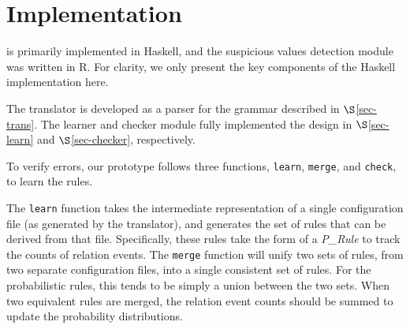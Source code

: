 \section{Implementation}

\app is primarily implemented in Haskell, and the suspicious values
detection module was written in R. 
For clarity,
we only present the key components of the Haskell implementation here.

The translator is developed as a parser for the grammar
described in $\S$\ref{sec-trans}. 
The learner and checker module fully implemented 
the design in $\S$\ref{sec-learn} and $\S$\ref{sec-checker},
respectively. 
 




To verify errors,
our prototype follows three functions, 
\lstinline{learn}, \lstinline{merge}, and \lstinline{check},
to learn the rules.

The \lstinline{learn} function takes the intermediate representation of 
a single configuration file (as generated by the translator), 
and generates the set of rules that can be derived from that file.
Specifically, these rules take the form of 
a \textit{P\_Rule} to track the counts of relation events.
The \lstinline{merge} function will unify two sets of rules, from two separate configuration files, into a single consistent set of rules. 
For the probabilistic rules, this tends to be simply a union between the two sets. 
When two equivalent rules are merged, the relation event counts should be summed to update the probability distributions.

